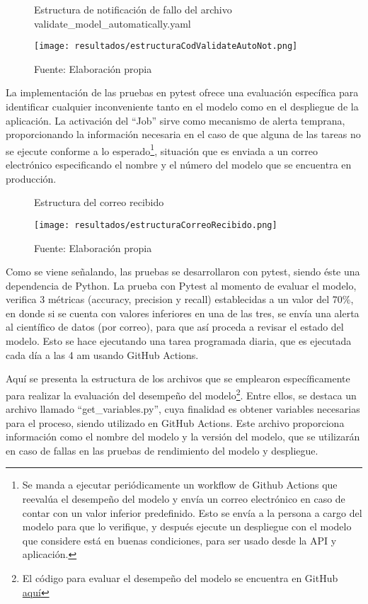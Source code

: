 \begin{figure}[h]
	\centering
	\caption{Estructura de notificación de fallo del archivo validate\_model\_automatically.yaml}
	\texttt{[image: resultados/estructuraCodValidateAutoNot.png]}
	\caption*{\footnotesize Fuente: Elaboración propia}
	\label{fig:figuraEstructuraCodValidateAutoNot}
\end{figure}

\newpage

La implementación de las pruebas en pytest ofrece una evaluación específica para identificar cualquier inconveniente tanto en el modelo como en el despliegue de la aplicación. La activación del ``Job'' sirve como mecanismo de alerta temprana, proporcionando la información necesaria en el caso de que alguna de las tareas no se ejecute conforme a lo esperado\footnote{Se manda a ejecutar periódicamente un workflow de Github Actions que reevalúa el desempeño del modelo y envía un correo electrónico en caso de contar con un valor inferior predefinido. Esto se envía a la persona a cargo del modelo para que lo verifique, y después ejecute un despliegue con el modelo que considere está en buenas condiciones, para ser usado desde la API y aplicación.}, situación que es enviada a un correo electrónico especificando el nombre y el número del modelo que se encuentra en producción.

\begin{figure}[h]
	\centering
	\caption{Estructura del correo recibido}
	\texttt{[image: resultados/estructuraCorreoRecibido.png]}
	\caption*{\footnotesize Fuente: Elaboración propia}
	\label{fig:figuraEstructuraCorreoRecibido}
\end{figure}


Como se viene señalando, las pruebas se desarrollaron con pytest, siendo éste una dependencia de Python. La prueba con Pytest al momento de evaluar el modelo, verifica 3 métricas (accuracy, precision y recall) establecidas a un valor del 70\%, en donde si se cuenta con valores inferiores en una de las tres, se envía una alerta al científico de datos (por correo), para que así proceda a revisar el estado del modelo. Esto se hace ejecutando una tarea programada diaria, que es ejecutada cada día a las 4 am usando GitHub Actions. 

\newpage

Aquí se presenta la estructura de los archivos que se emplearon específicamente para realizar la evaluación del desempeño del modelo\footnote{El código para evaluar el desempeño del modelo se encuentra en GitHub \href{https://github.com/juferoto/mlops_project/tree/master/training/tests}{aquí}}. Entre ellos, se destaca un archivo llamado ``get\_variables.py'', cuya finalidad es obtener variables necesarias para el proceso, siendo utilizado en GitHub Actions. Este archivo proporciona información como el nombre del modelo y la versión del modelo, que se utilizarán en caso de fallas en las pruebas de rendimiento del modelo y despliegue.


